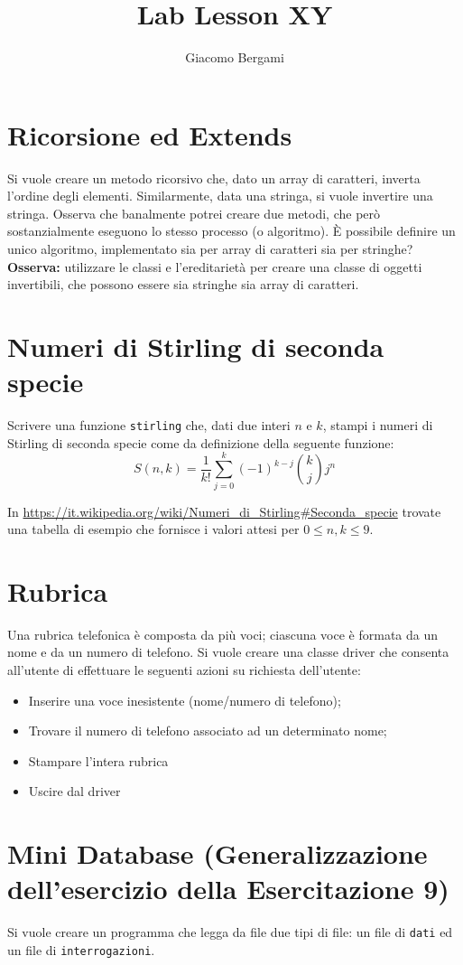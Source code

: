 \documentclass[]{scrartcl}
\title{Lab Lesson XY}
\author{Giacomo Bergami}
\begin{document}
\maketitle
\section{Ricorsione ed Extends}
Si vuole creare un metodo ricorsivo che, dato un array di caratteri, inverta l'ordine degli elementi. Similarmente, data una stringa, si vuole invertire una stringa. Osserva che banalmente potrei creare due metodi, che però sostanzialmente eseguono lo stesso processo (o algoritmo). È possibile definire un unico algoritmo, implementato sia per array di caratteri sia per stringhe? \textbf{Osserva:} utilizzare le classi e l'ereditarietà per creare una classe di oggetti invertibili, che possono essere sia stringhe sia array di caratteri.

\section{Numeri di Stirling di seconda specie}
Scrivere una funzione \texttt{stirling} che, dati due interi $n$ e $k$, stampi i numeri di Stirling di seconda specie come da definizione della seguente funzione:
\[S(n,k)=\frac{1}{k!}\sum_{j=0}^k(-1)^{k-j}\binom{k}{j}j^n\]

In \url{https://it.wikipedia.org/wiki/Numeri_di_Stirling#Seconda_specie} trovate una tabella di esempio che fornisce i valori attesi per $0\leq n,k\leq 9$.

\section{Rubrica}
Una rubrica telefonica è composta da più voci; ciascuna voce è formata da un nome e da un numero di telefono. Si vuole creare una classe driver che consenta all'utente di effettuare le seguenti azioni su richiesta dell'utente:
\begin{itemize}
\item Inserire una voce inesistente (nome/numero di telefono);
\item Trovare il numero di telefono associato ad un determinato nome;
\item Stampare l'intera rubrica
\item Uscire dal driver
\end{itemize}

\section*{Mini Database (Generalizzazione dell'esercizio della Esercitazione 9)}
Si vuole creare un programma che legga da file due tipi di file: un file di \texttt{dati} ed un file di \texttt{interrogazioni}. 
\end{document}
